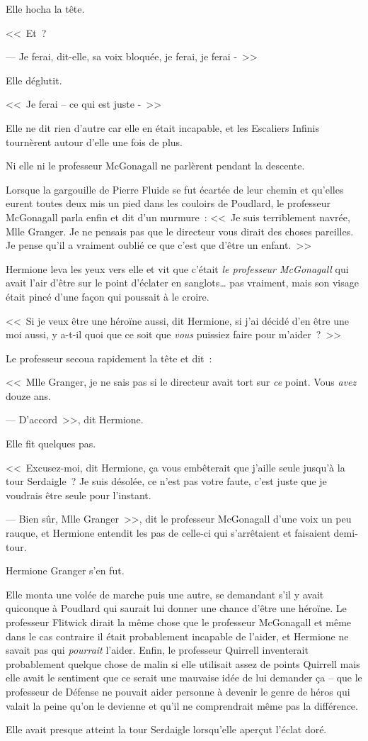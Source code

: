 Elle hocha la tête.

<<~Et~?

--- Je ferai, dit-elle, sa voix bloquée, je ferai, je ferai -~>>

Elle déglutit.

<<~Je ferai -- ce qui est juste -~>>

Elle ne dit rien d'autre car elle en était incapable, et les Escaliers Infinis tournèrent autour d'elle une fois de plus.

Ni elle ni le professeur McGonagall ne parlèrent pendant la descente.

Lorsque la gargouille de Pierre Fluide se fut écartée de leur chemin et qu'elles eurent toutes deux mis un pied dans les couloirs de Poudlard, le professeur McGonagall parla enfin et dit d'un murmure~: <<~Je suis terriblement navrée, Mlle Granger. Je ne pensais pas que le directeur vous dirait des choses pareilles. Je pense qu'il a vraiment oublié ce que c'est que d'être un enfant.~>>

Hermione leva les yeux vers elle et vit que c'était \emph{le professeur McGonagall} qui avait l'air d'être sur le point d'éclater en sanglots… pas vraiment, mais son visage était pincé d'une façon qui poussait à le croire.

<<~Si je veux être une héroïne aussi, dit Hermione, si j'ai décidé d'en être une moi aussi, y a-t-il quoi que ce soit que \emph{vous} puissiez faire pour m'aider~?~>>

Le professeur secoua rapidement la tête et dit~:

<<~Mlle Granger, je ne sais pas si le directeur avait tort sur \emph{ce} point. Vous \emph{avez} douze ans.

--- D'accord~>>, dit Hermione.

Elle fit quelques pas.

<<~Excusez-moi, dit Hermione, ça vous embêterait que j'aille seule jusqu'à la tour Serdaigle~? Je suis désolée, ce n'est pas votre faute, c'est juste que je voudrais être seule pour l'instant.

--- Bien sûr, Mlle Granger~>>, dit le professeur McGonagall d'une voix un peu rauque, et Hermione entendit les pas de celle-ci qui s'arrêtaient et faisaient demi-tour.

Hermione Granger s'en fut.

Elle monta une volée de marche puis une autre, se demandant s'il y avait quiconque à Poudlard qui saurait lui donner une chance d'être une héroïne. Le professeur Flitwick dirait la même chose que le professeur McGonagall et même dans le cas contraire il était probablement incapable de l'aider, et Hermione ne savait pas qui \emph{pourrait} l'aider. Enfin, le professeur Quirrell inventerait probablement quelque chose de malin si elle utilisait assez de points Quirrell mais elle avait le sentiment que ce serait une mauvaise idée de lui demander ça -- que le professeur de Défense ne pouvait aider personne à devenir le genre de héros qui valait la peine qu'on le devienne et qu'il ne comprendrait même pas la différence.

Elle avait presque atteint la tour Serdaigle lorsqu'elle aperçut l'éclat doré.
